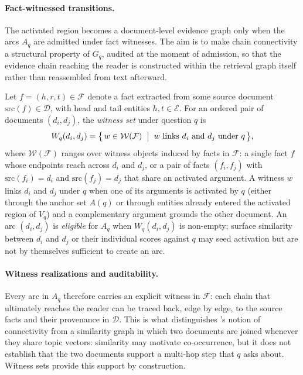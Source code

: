 \paragraph{Fact-witnessed transitions.}
\label{sec:method:transition}
The activated region becomes a document-level evidence graph only when the
arcs $A_q$ are admitted under fact witnesses. The aim is to make chain
connectivity a structural property of $G_q$, audited at the moment of
admission, so that the evidence chain reaching the reader is constructed
within the retrieval graph itself rather than reassembled from text
afterward.

Let $f = (h, r, t) \in \mathcal{F}$ denote a fact extracted from some
source document $\mathrm{src}(f) \in \mathcal{D}$, with head and tail
entities $h, t \in \mathcal{E}$. For an ordered pair of documents
$(d_i, d_j)$, the \emph{witness set} under question $q$ is
\begin{equation}
\label{eq:witness-set}
W_q(d_i, d_j) = \bigl\{\, w \in \mathcal{W}(\mathcal{F}) \;\bigm|\;
w \text{ links } d_i \text{ and } d_j \text{ under } q \,\bigr\},
\end{equation}
where $\mathcal{W}(\mathcal{F})$ ranges over witness objects induced by
facts in $\mathcal{F}$: a single fact $f$ whose endpoints reach across
$d_i$ and $d_j$, or a pair of facts $(f_i, f_j)$ with
$\mathrm{src}(f_i) = d_i$ and $\mathrm{src}(f_j) = d_j$ that share an
activated argument. A witness $w$ links $d_i$ and $d_j$ under $q$ when one
of its arguments is activated by $q$ (either through the anchor set
$A(q)$ or through entities already entered the activated region of $V_q$)
and a complementary argument grounds the other document. An arc
$(d_i, d_j)$ is \emph{eligible} for $A_q$ when $W_q(d_i, d_j)$ is
non-empty; surface similarity between $d_i$ and $d_j$ or their individual
scores against $q$ may seed activation but are not by themselves
sufficient to create an arc.

\paragraph{Witness realizations and auditability.}
Every arc in $A_q$ therefore carries an explicit witness in $\mathcal{F}$:
each chain that ultimately reaches the reader can be traced back, edge by
edge, to the source facts and their provenance in $\mathcal{D}$. This is
what distinguishes \methodname{}'s notion of connectivity from a
similarity graph in which two documents are joined whenever they share
topic vectors: similarity may motivate co-occurrence, but it does not
establish that the two documents support a multi-hop step that $q$ asks
about. Witness sets provide this support by construction.

